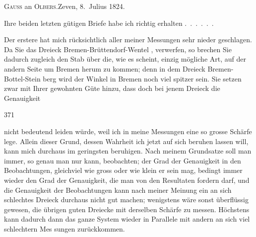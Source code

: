 \begin{center}
\textsc{Gauss} an \textsc{Olbers}.\quad Zeven, 8.~Julius 1824.
\end{center}

\par\noindent\hspace*{\parindent}Ihre beiden letzten gütigen Briefe habe ich richtig erhalten .\ .\ .\ .\ .\ .

\par\noindent\hspace*{\parindent}Der erstere hat mich rücksichtlich aller meiner Messungen sehr nieder\-%
geschlagen. Da Sie das Dreieck Bremen-Brüttendorf-Wentel , verwerfen, so brechen Sie dadurch zugleich
den Stab über die, wie es scheint, einzig mögliche Art, auf der andern Seite
um Bremen herum zu kommen; denn in dem Dreieck Bremen-Bottel-Stein\-%
berg wird der Winkel in Bremen noch viel spitzer sein. Sie setzen zwar mit Ihrer
gewohnten Güte hinzu, dass doch bei jenem Dreieck die Genauigkeit 
\par\clearpage
{}\hfill371\par\medskip
\noindent{} nicht bedeutend leiden würde, weil ich in meine Messungen eine so
grosse Schärfe lege. Allein dieser Grund, dessen Wahrheit ich jetzt auf sich
beruhen lassen will, kann mich durchaus im geringsten  beruhigen.
Nach meinem Grundsatze soll man immer, so genau man nur kann, beobachten;
der Grad der Genauigkeit in den Beobachtungen, gleichviel wie gross oder
wie klein er sein mag, bedingt immer wieder den Grad der Genauigkeit, die
man von den Resultaten fordern darf, und die Genauigkeit der Beobachtungen
kann nach meiner Meinung ein an sich schlechtes Dreieck durchaus nicht
gut machen; wenigstens wäre sonst überflüssig gewesen, die übrigen guten
Dreiecke mit derselben Schärfe zu messen. Höchstens kann dadurch dann
das ganze System wieder in Parallele mit andern an sich viel schlechtern Mes\-%
sungen zurückkommen.

